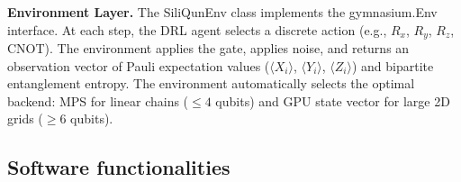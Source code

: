 \documentclass[preprint,12pt, a4paper]{elsarticle}
\begin{document}
\begin{table}[htbp]
\centering
\caption{Built-in silicon spin qubit device profiles in SiliQun.}
\label{tab:devices}
\end{table}

\noindent\textbf{Environment Layer.} The \textsf{SiliQunEnv} class implements the \textsf{gymnasium.Env} interface. At each step, the DRL agent selects a discrete action (e.g., $R_x$, $R_y$, $R_z$, CNOT). The environment applies the gate, applies noise, and returns an observation vector of Pauli expectation values ($\langle X_i \rangle$, $\langle Y_i \rangle$, $\langle Z_i \rangle$) and bipartite entanglement entropy. The environment automatically selects the optimal backend: MPS for linear chains ($\leq 4$ qubits) and GPU state vector for large 2D grids ($\geq 6$ qubits).

\subsection{Software functionalities}
\end{document}
